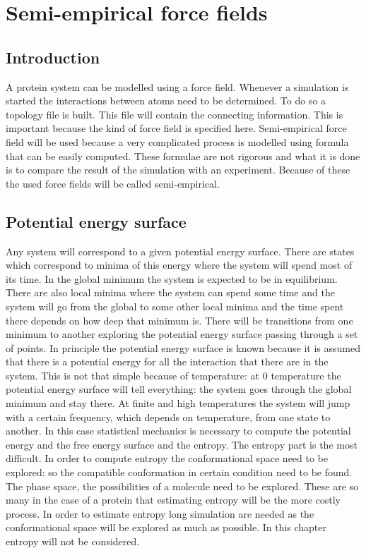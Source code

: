 \graphicspath{{chapters/03/images/}}
\chapter{Semi-empirical force fields}

\section{Introduction}
A protein system can be modelled using a force field.
Whenever a simulation is started the interactions between atoms need to be determined.
To do so a topology file is built.
This file will contain the connecting information.
This is important because the kind of force field is specified here.
Semi-empirical force field will be used because a very complicated process is modelled using formula that can be easily computed.
These formulae are not rigorous and what it is done is to compare the result of the simulation with an experiment.
Because of these the used force fields will be called semi-empirical.

\section{Potential energy surface}
Any system will correspond to a given potential energy surface.
There are states which correspond to minima of this energy where the system will spend most of its time.
In the global minimum the system is expected to be in equilibrium.
There are also local minima where the system can spend some time and the system will go from the global to some other local minima and the time spent there depends on how deep that minimum is.
There will be transitions from one minimum to another exploring the potential energy surface passing through a set of points.
In principle the potential energy surface is known because it is assumed that there is a potential energy for all the interaction that there are in the system.
This is not that simple because of temperature: at $0$ temperature the potential energy surface will tell everything: the system goes through the global minimum and stay there.
At finite and high temperatures the system will jump with a certain frequency, which depends on temperature, from one state to another.
In this case statistical mechanics is necessary to compute the potential energy and the free energy surface and the entropy.
The entropy part is the most difficult.
In order to compute entropy the conformational space need to be explored: so the compatible conformation in certain condition need to be found.
The phase space, the possibilities of a molecule need to be explored.
These are so many in the case of a protein that estimating entropy will be the more costly process.
In order to estimate entropy long simulation are needed as the conformational space will be explored as much as possible.
In this chapter entropy will not be considered.

